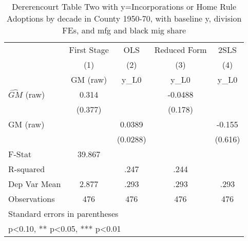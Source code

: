\begin{table}[htbp]\centering
\def\sym#1{\ifmmode^{#1}\else\(^{#1}\)\fi}
\caption{Dererencourt Table Two with y=Incorporations or Home Rule Adoptions by decade in County 1950-70, with baseline y, division FEs, and mfg and black mig share}
\begin{tabular}{l*{4}{c}}
\toprule
                    & First Stage   &         OLS   &Reduced Form   &        2SLS   \\
                    &\multicolumn{1}{c}{(1)}&\multicolumn{1}{c}{(2)}&\multicolumn{1}{c}{(3)}&\multicolumn{1}{c}{(4)}\\
                    &\multicolumn{1}{c}{GM  (raw)}&\multicolumn{1}{c}{y\_L0}&\multicolumn{1}{c}{y\_L0}&\multicolumn{1}{c}{y\_L0}\\
\midrule
$\hat{GM}$ (raw)    &       0.314   &               &     -0.0488   &               \\
                    &     (0.377)   &               &     (0.178)   &               \\
\addlinespace
GM  (raw)           &               &      0.0389   &               &      -0.155   \\
                    &               &    (0.0288)   &               &     (0.616)   \\
\midrule
F-Stat              &      39.867   &               &               &               \\
R-squared           &               &        .247   &        .244   &               \\
Dep Var Mean        &       2.877   &        .293   &        .293   &        .293   \\
Observations        &         476   &         476   &         476   &         476   \\
\bottomrule
\multicolumn{5}{l}{\footnotesize Standard errors in parentheses}\\
\multicolumn{5}{l}{\footnotesize * p<0.10, ** p<0.05, *** p<0.01}\\
\end{tabular}
\end{table}
